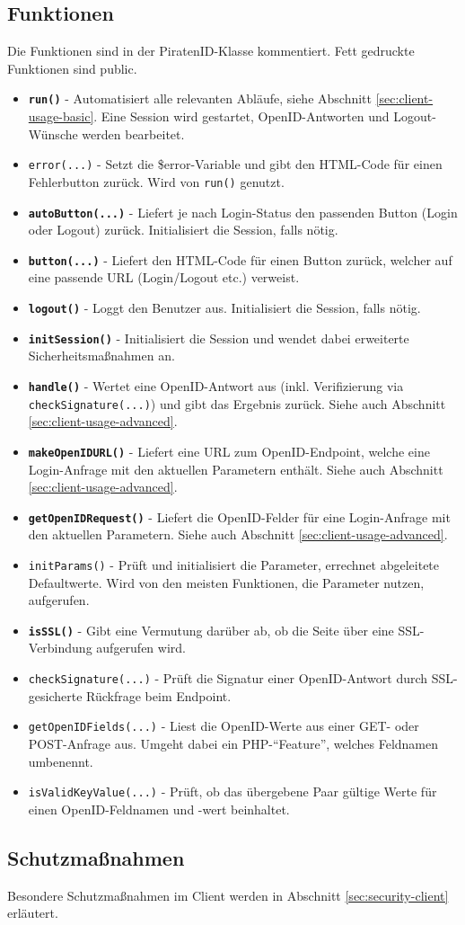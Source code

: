 \documentclass[parskip=half]{scrartcl}
\begin{document}
\subsection{Funktionen}
Die Funktionen sind in der PiratenID-Klasse kommentiert. Fett gedruckte Funktionen sind public.
\begin{itemize}
	\item \textbf{\texttt{run()}} -
		Automatisiert alle relevanten Abläufe, siehe Abschnitt \ref{sec:client-usage-basic}.
		Eine Session wird gestartet, OpenID-Antworten und Logout-Wünsche werden bearbeitet.
	\item \texttt{error(...)} -
		Setzt die \$error-Variable und gibt den HTML-Code für einen Fehlerbutton zurück. Wird von \texttt{run()} genutzt.
	\item \textbf{\texttt{autoButton(...)}} -
		Liefert je nach Login-Status den passenden Button (Login oder Logout) zurück. Initialisiert die Session, falls nötig.
	\item \textbf{\texttt{button(...)}} -
		Liefert den HTML-Code für einen Button zurück, welcher auf eine passende URL (Login/Logout etc.) verweist.
	\item \textbf{\texttt{logout()}} -
		Loggt den Benutzer aus. Initialisiert die Session, falls nötig.
	\item \textbf{\texttt{initSession()}} -
		Initialisiert die Session und wendet dabei erweiterte Sicherheitsmaßnahmen an.
	\item \textbf{\texttt{handle()}} -
		Wertet eine OpenID-Antwort aus (inkl. Verifizierung via \texttt{checkSignature(...)}) und gibt das Ergebnis zurück.
		Siehe auch Abschnitt  \ref{sec:client-usage-advanced}.
	\item \textbf{\texttt{makeOpenIDURL()}} -
		Liefert eine URL zum OpenID-Endpoint, welche eine Login-Anfrage mit den aktuellen Parametern enthält.
		Siehe auch Abschnitt  \ref{sec:client-usage-advanced}.
	\item \textbf{\texttt{getOpenIDRequest()}} -
		Liefert die OpenID-Felder für eine Login-Anfrage mit den aktuellen Parametern.
		Siehe auch Abschnitt  \ref{sec:client-usage-advanced}.
	\item \texttt{initParams()} -
		Prüft und initialisiert die Parameter, errechnet abgeleitete Defaultwerte.
		Wird von den meisten Funktionen, die Parameter nutzen, aufgerufen.
	\item \textbf{\texttt{isSSL()}} -
		Gibt eine Vermutung darüber ab, ob die Seite über eine SSL-Verbindung aufgerufen wird.
	\item \texttt{checkSignature(...)} -
		Prüft die Signatur einer OpenID-Antwort durch SSL-gesicherte Rückfrage beim Endpoint.
	\item \texttt{getOpenIDFields(...)} - 
		Liest die OpenID-Werte aus einer GET- oder POST-Anfrage aus. Umgeht dabei ein PHP-"`Feature"', welches Feldnamen umbenennt.
	\item \texttt{isValidKeyValue(...)} - 
		Prüft, ob das übergebene Paar gültige Werte für einen OpenID-Feldnamen und -wert beinhaltet.
	

\end{itemize}

\subsection{Schutzmaßnahmen}
Besondere Schutzmaßnahmen im Client werden in Abschnitt \ref{sec:security-client} erläutert.
\end{document}
